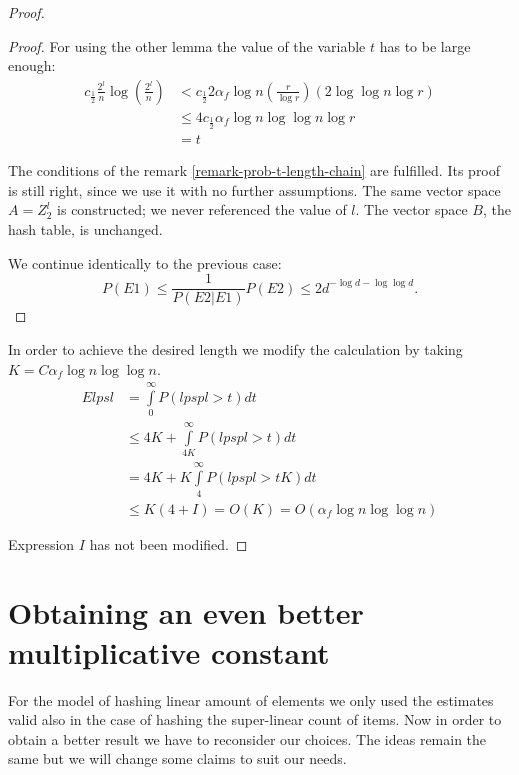 \begin{proof}
\begin{proof}
For using the other lemma the value of the variable $t$ has to be large enough:
\begin{displaymath}
\begin{split}
c_{\frac{1}{2}} \frac{2^l}{n} \log \left(\frac{2^l}{n}\right) 
	& < c_{\frac{1}{2}} 2 \alpha_f \log n \left( \frac{r}{\log r} \right) \left(2 \log \log n \log r \right) \\
	& \leq 4 c_{\frac{1}{2}} \alpha_f \log n \log \log n \log r \\
	& = t
\end{split}
\end{displaymath}

The conditions of the remark \ref{remark-prob-t-length-chain} are fulfilled. Its proof is still right, since we use it with no further assumptions. The same vector space $A = Z_2^l$ is constructed; we never referenced the value of $l$. The vector space $B$, the hash table, is unchanged.

We continue identically to the previous case:
\begin{displaymath}
P(E1) \leq \frac{1}{P(E2|E1)}P(E2) \leq 2 d ^ {-\log d - \log \log d}\textit{.}
\end{displaymath}
\end{proof}

In order to achieve the desired length we modify the calculation by taking $K = C \alpha_f \log n \log \log n$.
\begin{displaymath}
\begin{split}
E lpsl 
	& = \int\limits_0^\infty P(lpspl > t) dt \\
	& \leq 4K + \int\limits_{4K}^\infty P(lpspl > t) dt \\
	& = 4K + K\int\limits_4^\infty P(lpspl > tK) dt \\
	& \leq K(4 + I) = O(K) = O(\alpha_f \log n \log \log n)
\end{split}
\end{displaymath}

Expression $I$ has not been modified.
\end{proof}

\section{Obtaining an even better multiplicative constant}
For the model of hashing linear amount of elements we only used the estimates valid also in the case of hashing the super-linear count of items. Now in order to obtain a better result we have to reconsider our choices. The ideas remain the same but we will change some claims to suit our needs.

